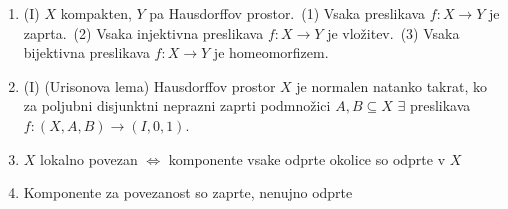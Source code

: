 \documentclass[10pt,a4paper]{article}
\begin{document}
\begin{enumerate}
\item (I)  $X$ kompakten, $Y$ pa Hausdorffov prostor.~(1) Vsaka preslikava $f:X\to Y$ je zaprta.~(2) Vsaka injektivna preslikava $f:X\to Y$ je vložitev.~(3) Vsaka bijektivna preslikava $f:X\to Y$ je homeomorfizem.
            
\item (I) (Urisonova lema) Hausdorffov prostor $X$ je normalen natanko takrat, ko za poljubni disjunktni neprazni zaprti podmnožici $A,B\subseteq X$ $\exists$ preslikava $f:(X,A,B)\to(I,0,1)$.
    
\item \(X\) lokalno povezan \(\iff\) komponente vsake odprte okolice so odprte v \(X\)
\item Komponente za povezanost so zaprte, nenujno odprte
        \end{enumerate}
\end{document}
